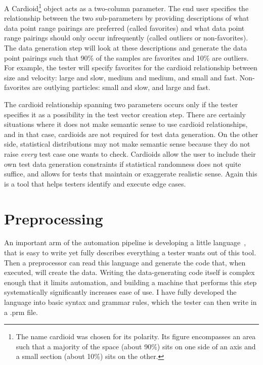 A Cardioid\footnote{The name cardioid was chosen for its polarity. Its figure encompasses an area such that a majority of the space (about 90\%) sits on one side of an axis and a small section (about 10\%) sits on the other.} object acts as a two-column parameter. The end user specifies the relationship between the two sub-parameters by providing descriptions of what data point range pairings are preferred (called favorites) and what data point range pairings should only occur infrequently (called outliers or non-favorites). The data generation step will look at these descriptions and generate the data point pairings such that 90\% of the samples are favorites and 10\% are outliers. For example, the tester will specify favorites for the cardioid relationship between size and velocity: large and slow, medium and medium, and small and fast. Non-favorites are outlying particles: small and slow, and large and fast.

The cardioid relationship spanning two parameters occurs only if the tester specifies it as a possibility in the test vector creation step. There are certainly situations where it does not make semantic sense to use cardioid relationships, and in that case, cardioids are not required for test data generation. On the other side, statistical distributions may not make semantic sense because they do not raise \textit{every} test case one wants to check. Cardioids allow the user to include their own test data generation constraints if statistical randomness does not quite suffice, and allows for tests that maintain or exaggerate realistic sense. Again this is a tool that helps testers identify and execute edge cases.

\section{Preprocessing}

An important arm of the automation pipeline is developing a little language~\cite{Bentley:1986:PP:600875}, that is easy to write yet fully describes everything a tester wants out of this tool. Then a preprocessor can read this language and generate the code that, when executed, will create the data. Writing the data-generating code itself is complex enough that it limits automation, and building a machine that performs this step systematically significantly increases ease of use. I have fully developed the language into basic syntax and grammar rules, which the tester can then write in a .prm file.

